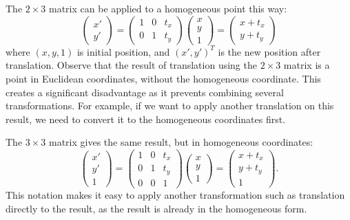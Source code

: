 \documentclass[11pt, oneside, reqno]{book}
\begin{document}
The $2\times3$ matrix can be applied to a homogeneous point this way:
\[
\begin{pmatrix}
x' \\ y'
\end{pmatrix}
= 
\begin{pmatrix}
1 & 0 & t_x \\
0 & 1 & t_y
\end{pmatrix}
\begin{pmatrix}
x \\ y \\ 1
\end{pmatrix}
= 
\begin{pmatrix}
x + t_x \\
y + t_y
\end{pmatrix}
\]
where $\left(x, y, 1\right)$ is initial position, and $\left(x', y'\right)^T$ is the new position after translation. Observe that the result of translation using the $2\times 3$ matrix is a point in Euclidean coordinates, without the homogeneous coordinate. This creates a significant disadvantage as it prevents combining several transformations. For example, if we want to apply another translation on this result, we need to convert it to the homogeneous coordinates first.

The $ 3\times 3 $ matrix gives the same result, but in homogeneous coordinates:
\[ 
\begin{pmatrix}
x' \\ y' \\ 1
\end{pmatrix}
=
\begin{pmatrix}
1 & 0 & t_x \\
0 & 1 & t_y \\
0 & 0 & 1
\end{pmatrix}
\begin{pmatrix}
x \\ y \\ 1
\end{pmatrix}
= 
\begin{pmatrix}
x + t_x \\
y + t_y \\
1
\end{pmatrix}.
\]
This notation makes it easy to apply another transformation such as translation directly to the result, as the result is already in the homogeneous form.
\end{document}
